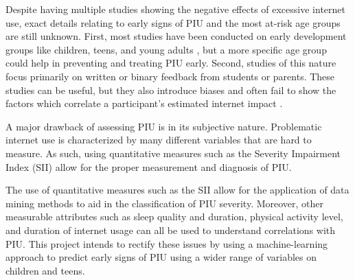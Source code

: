 \documentclass[12pt]{extarticle}
\begin{document}

Despite having multiple studies showing the negative effects of excessive internet use, exact details relating to early signs of PIU and the most at-risk age groups are still unknown.
First, most studies have been conducted on early development groups like children, teens, and young adults \cite{Pettorruso2020-qt,Cash2012-rb,Aboujaoude2010-mc,Restrepo2020-pb}, but a more specific age group could help in preventing and treating PIU early.
Second, studies of this nature focus primarily on written or binary feedback from students or parents. 
These studies can be useful, but they also introduce biases and often fail to show the factors which correlate a participant's estimated internet impact \cite{Restrepo2020-pb,Aboujaoude2010-mc}.

A major drawback of assessing PIU is in its subjective nature. Problematic internet use is characterized by many different variables that are hard to measure. As such, using quantitative measures such as the Severity Impairment Index (SII) allow for the proper measurement and diagnosis of PIU.

The use of quantitative measures such as the SII allow for the application of data mining methods to aid in the classification of PIU severity. Moreover, other measurable attributes such as sleep quality and duration, physical activity level, and duration of internet usage can all be used to understand correlations with PIU.
This project intends to rectify these issues by using a machine-learning approach to predict early signs of PIU using a wider range of variables on children and teens.
\end{document}
